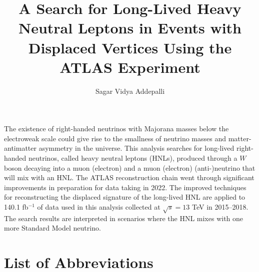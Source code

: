 \documentclass{brandeis-dissertation3.14}
\title{A Search for Long-Lived Heavy Neutral Leptons in Events with Displaced Vertices Using the ATLAS Experiment}
\author{Sagar Vidya Addepalli}
\begin{document}
\maketitlepage
\makeapproval
\setlength{\cftchapnumwidth}{3em}
\setlength{\cfttabnumwidth}{3em}
\setlength{\cftfignumwidth}{3em}

\begin{dissertation-acknowledgements}
\doublespacing

\end{dissertation-acknowledgements}

\begin{dissertation-abstract}
The existence of right-handed neutrinos with Majorana masses below the electroweak scale could give rise to the smallness of neutrino masses and matter-antimatter asymmetry in the universe. This analysis searches for long-lived right-handed neutrinos, called heavy neutral leptons (HNLs), produced through a $W$ boson decaying into a muon (electron) and a muon (electron) (anti-)neutrino that will mix with an HNL. The ATLAS reconstruction chain went through significant improvements in preparation for data taking in 2022. The improved techniques for reconstructing the displaced signature of the long-lived HNL are applied to 140.1 fb$^{-1}$ of data used in this analysis collected at $\sqrt{s}=13$ TeV in 2015--2018. The search results are interpreted in scenarios where the HNL mixes with one more Standard Model neutrino.
\end{dissertation-abstract}

\doublespacing
\pagestyle{fancy}
\fancyhead{}
\renewcommand{\headrulewidth}{0pt}


\tableofcontents
\clearpage

\listoftables
\pagebreak
\listoffigures
\pagebreak
\setcounter{secnumdepth}{0}
\chapter*{List of Abbreviations}

\setcounter{secnumdepth}{2}

\startbody

\end{document}
